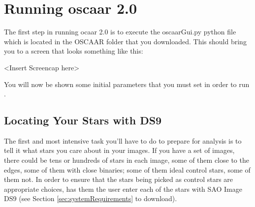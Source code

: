 \documentclass{article}
\begin{document}
\section{Running oscaar 2.0}

The first step in running ocaar 2.0 is to execute the oscaarGui.py python file which is located in the OSCAAR folder that you downloaded. This should bring you to a screen that looks something like this:

<Insert Screencap here>

You will now be shown some initial parameters that you must set in order to run \oscaar.


\subsection{Locating Your Stars with DS9}

The first and most intensive task you'll have to do to prepare \oscaar  for analysis is to tell it what stars you care about in your images. If you have a set of images, there could be tens or hundreds of stars in each image, some of them close to the edges, some of them with close binaries; some of them ideal control stars, some of them not. In order to ensure that the stars being picked as control stars are appropriate choices, \oscaar has them the user enter each of the stars with SAO Image DS9 (see Section \ref{sec:systemRequirements} to download). 
\end{document}
